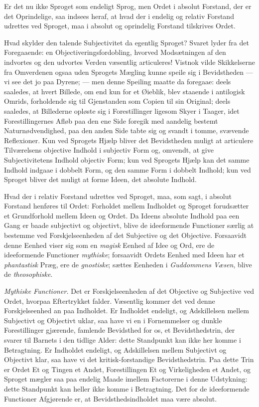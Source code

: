 \documentclass[12pt]{book}
\newcommand{\opage}[1]{\marginnote{\footnotesize\textit{[#1]}}}
\begin{document}
Er det nu ikke Sproget som endeligt Sprog, men Ordet
i absolut Forstand, der er det Oprindelige, saa indsees heraf,
at hvad der i endelig og relativ Forstand udrettes ved Sproget,
maa i absolut og oprindelig Forstand tilskrives Ordet.

Hvad skylder den talende Subjectivitet da egentlig Sproget?
Svaret lyder fra det Foregaaende: en Objectiveringsfordobling,
hvorved Modsætningen af den indvortes og den udvortes
Verden væsentlig articuleres! Vistnok vilde Skikkelserne fra
Omverdenen ogsaa uden Sprogets Mægling kunne speile sig
i Bevidstheden --- vi see det jo paa Dyrene; --- men denne
Speiling maatte da foregaae: deels saaledes, at hvert Billede,
om end kun for et Øieblik, blev staaende i antilogisk Omrids,
forholdende sig til Gjenstanden som Copien til sin Original;
deels saaledes, at Billederne opløste sig i Forestillinger ligesom
Skyer i Taager, idet Forestillingernes Afløb paa den ene Side
foregik med aandelig bestemt Naturnødvendighed, paa den
anden Side tabte sig og svandt i tomme, svævende Reflexioner.
Kun ved Sprogets Hjælp bliver det Bevidstheden muligt at
articulere Tilværelsens objective Indhold i subjectiv Form og,
omvendt, at give Subjectivitetens Indhold objectiv Form; kun
ved Sprogets Hjælp kan det samme Indhold indgaae i dobbelt
Form, og den samme Form i dobbelt Indhold; kun ved
Sproget bliver det muligt at forme Ideen, det absolute
Indhold.

Hvad der i relativ Forstand udrettes ved Sproget, maa,
som sagt, i absolut Forstand henføres til Ordet: Forholdet
\opage{73}mellem Indholdet og Sproget forudsætter et Grundforhold
mellem Ideen og Ordet. Da Ideens absolute Indhold paa
een Gang er baade subjectivt og objectivt, blive de ideeformende
Functioner særlig at bestemme ved Forskjelseenheden af det
Subjective og det Objective. Forsaavidt denne Eenhed viser
sig som en \emph{magisk} Eenhed af Idee og Ord, ere de ideeformende
Functioner \emph{mythiske}; forsaavidt Ordets Eenhed med
Ideen har et \emph{phantastisk} Præg, ere de \emph{gnostiske}; sættes
Eenheden i \emph{Guddommens Væsen}, blive de \emph{theosophiske}.

\emph{Mythiske Functioner.} Det er Forskjelseenheden af
det Objective og Subjective ved Ordet, hvorpaa Eftertrykket
falder. Væsentlig kommer det ved denne Forskjelseenhed an
paa Indholdet. Er Indholdet endeligt, og Adskillelsen mellem
Subjectivt og Objectivt uklar, saa have vi en i Fornemmelser
og dunkle Forestillinger gjærende, famlende Bevidsthed for os,
et Bevidsthedstrin, der svarer til Barnets i den tidlige Alder:
dette Standpunkt kan ikke her komme i Betragtning. Er
Indholdet endeligt, og Adskillelsen mellem Subjectivt og Objectivt
klar, saa have vi det kritisk-forstandige Bevidsthedstrin.
Paa dette Trin er Ordet Et og Tingen et Andet, Forestillingen
Et og Virkeligheden et Andet, og Sproget mægler saa paa
endelig Maade imellem Factorerne i denne Udstykning: dette
Standpunkt kan heller ikke komme i Betragtning. Det for
de ideeformende Functioner Afgjørende er, at Bevidsthedsindholdet
maa være absolut.
\end{document}
